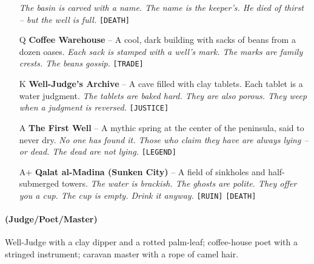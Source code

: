 \begin{enumerate}
  \hfill \textit{The basin is carved with a name. The name is the keeper's. He died of thirst -- but the well is full.} \texttt{[DEATH]}
\item[Q] \textbf{Coffee Warehouse} -- A cool, dark building with sacks of beans from a dozen oases.
  \hfill \textit{Each sack is stamped with a well's mark. The marks are family crests. The beans gossip.} \texttt{[TRADE]}
\item[K] \textbf{Well-Judge's Archive} -- A cave filled with clay tablets. Each tablet is a water judgment.
  \hfill \textit{The tablets are baked hard. They are also porous. They weep when a judgment is reversed.} \texttt{[JUSTICE]}
\item[A] \textbf{The First Well} -- A mythic spring at the center of the peninsula, said to never dry.
  \hfill \textit{No one has found it. Those who claim they have are always lying -- or dead. The dead are not lying.} \texttt{[LEGEND]}
\item[A+] \textbf{Qalat al-Madina (Sunken City)} -- A field of sinkholes and half-submerged towers.
  \hfill \textit{The water is brackish. The ghosts are polite. They offer you a cup. The cup is empty. Drink it anyway.} \texttt{[RUIN]} \texttt{[DEATH]}
\end{enumerate}

\paragraph*{(Judge/Poet/Master)} Well-Judge with a clay dipper and a rotted palm-leaf; coffee-house poet with a stringed instrument; caravan master with a rope of camel hair.

